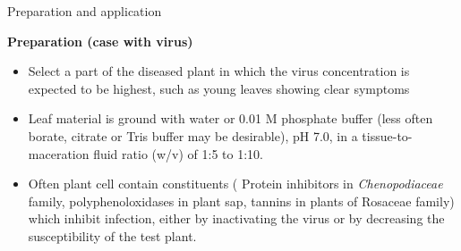 \documentclass[11pt,dvipsnames,ignorenonframetext,aspectratio=169]{beamer}
\providecommand{\tightlist}{%
  \setlength{\itemsep}{0pt}\setlength{\parskip}{0pt}}
\newcommand{\ecolumns}{\end{columns}}
\begin{document}

\begin{frame}{Preparation and application}
\protect\hypertarget{preparation-and-application}{}
\footnotesize

\textbf{Preparation (case with virus)}

\begin{itemize}
\tightlist
\item
  Select a part of the diseased plant in which the virus concentration
  is expected to be highest, such as young leaves showing clear symptoms
\item
  Leaf material is ground with water or 0.01 M phosphate buffer (less
  often borate, citrate or Tris buffer may be desirable), pH 7.0, in a
  tissue-to-maceration fluid ratio (w/v) of 1:5 to 1:10.
\item
  Often plant cell contain constituents ( Protein inhibitors in
  \emph{Chenopodiaceae} family, polyphenoloxidases in plant sap, tannins
  in plants of Rosaceae family) which inhibit infection, either by
  inactivating the virus or by decreasing the susceptibility of the test
  plant.
\end{itemize}
\end{frame}
\end{document}
